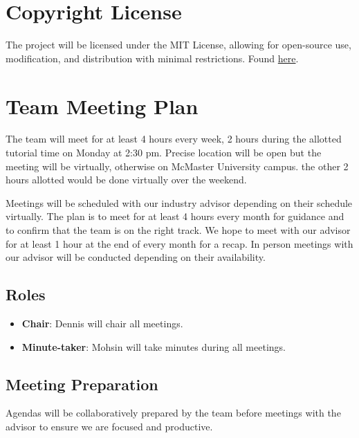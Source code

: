 \documentclass{article}
\begin{document}

\section{Copyright License}
The project will be licensed under the MIT License, allowing for open-source use, modification, 
and distribution with minimal restrictions. Found \href{https://github.com/lilweege/SyntaxSentinels?tab=License-1-ov-file#}{here}.

\section{Team Meeting Plan}

The team will meet for at least 4 hours every week, 2 hours during the allotted tutorial 
time on Monday at 2:30 pm. Precise location will be open but the meeting will be virtually, 
otherwise on McMaster University campus. the other 2 hours allotted would be done virtually over the weekend.


Meetings will be scheduled with our industry advisor depending on their schedule virtually. 
The plan is to meet for at least 4 hours every month for guidance and to confirm that the team 
is on the right track. We hope to meet with our advisor for at least 1 hour at the end of every 
month for a recap. In person meetings with our advisor will be conducted depending on their availability.

\subsection*{Roles}

\begin{itemize}
    \item \textbf{Chair}: Dennis will chair all meetings.
    \item \textbf{Minute-taker}: Mohsin will take minutes during all meetings.
\end{itemize}

\subsection*{Meeting Preparation}

Agendas will be collaboratively prepared by the team before meetings with the advisor to 
ensure we are focused and productive.
\end{document}
